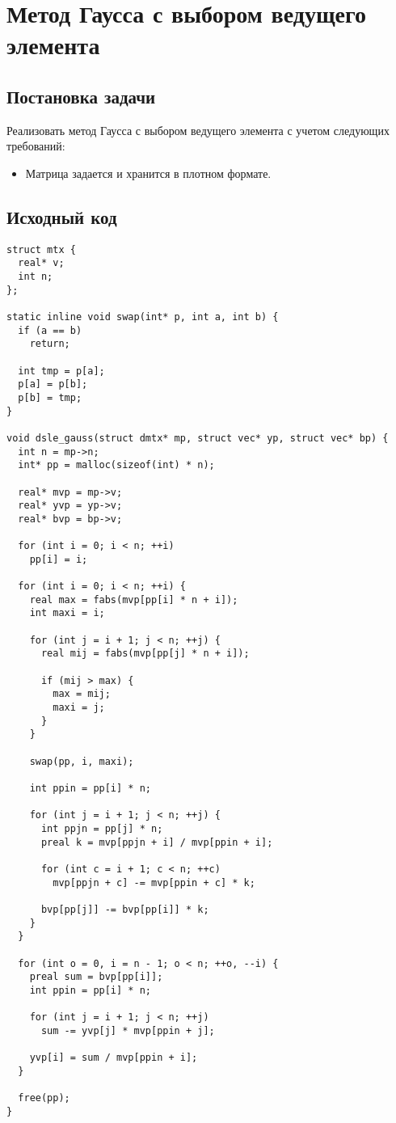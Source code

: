 \documentclass[12pt, a4paper]{article}
\begin{document}
\newpage

\section{Метод Гаусса с выбором ведущего элемента}
\subsection{Постановка задачи}
Реализовать метод Гаусса с выбором ведущего элемента с учетом следующих требований:

\begin{itemize}
  \item Матрица задается и хранится в плотном формате.
\end{itemize}

\subsection{Исходный код}

\begin{verbatim}
struct mtx {
  real* v;
  int n;
};

static inline void swap(int* p, int a, int b) {
  if (a == b)
    return;

  int tmp = p[a];
  p[a] = p[b];
  p[b] = tmp;
}

void dsle_gauss(struct dmtx* mp, struct vec* yp, struct vec* bp) {
  int n = mp->n;
  int* pp = malloc(sizeof(int) * n);

  real* mvp = mp->v;
  real* yvp = yp->v;
  real* bvp = bp->v;

  for (int i = 0; i < n; ++i)
    pp[i] = i;

  for (int i = 0; i < n; ++i) {
    real max = fabs(mvp[pp[i] * n + i]);
    int maxi = i;

    for (int j = i + 1; j < n; ++j) {
      real mij = fabs(mvp[pp[j] * n + i]);

      if (mij > max) {
        max = mij;
        maxi = j;
      }
    }

    swap(pp, i, maxi);

    int ppin = pp[i] * n;

    for (int j = i + 1; j < n; ++j) {
      int ppjn = pp[j] * n;
      preal k = mvp[ppjn + i] / mvp[ppin + i];

      for (int c = i + 1; c < n; ++c)
        mvp[ppjn + c] -= mvp[ppin + c] * k;

      bvp[pp[j]] -= bvp[pp[i]] * k;
    }
  }

  for (int o = 0, i = n - 1; o < n; ++o, --i) {
    preal sum = bvp[pp[i]];
    int ppin = pp[i] * n;

    for (int j = i + 1; j < n; ++j)
      sum -= yvp[j] * mvp[ppin + j];

    yvp[i] = sum / mvp[ppin + i];
  }

  free(pp);
}
\end{verbatim}
\end{document}
